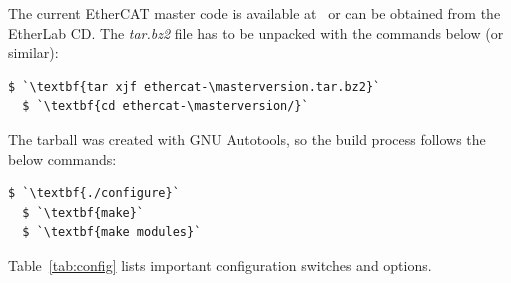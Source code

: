 \documentclass[a4paper,12pt,BCOR6mm,bibtotoc,idxtotoc]{scrbook}
\newcommand{\masterversion}{1.4.0}
\begin{document}
The current EtherCAT master code is available at~\cite{etherlab} or can be
obtained from the EtherLab CD. The \textit{tar.bz2} file has to be unpacked
with the commands below (or similar):

\begin{lstlisting}[gobble=2]
  $ `\textbf{tar xjf ethercat-\masterversion.tar.bz2}`
  $ `\textbf{cd ethercat-\masterversion/}`
\end{lstlisting}

The tarball was created with GNU Autotools, so the build process
follows the below commands:

\begin{lstlisting}[gobble=2]
  $ `\textbf{./configure}`
  $ `\textbf{make}`
  $ `\textbf{make modules}`
\end{lstlisting}

Table~\ref{tab:config} lists important configuration switches and options.
\end{document}
